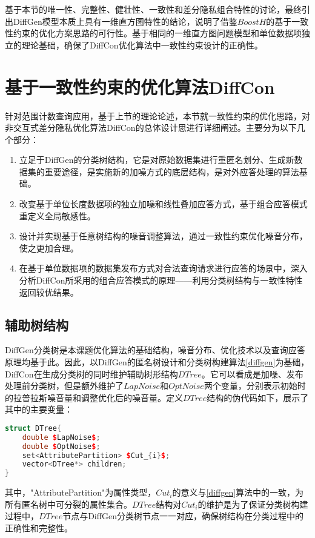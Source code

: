 基于本节的唯一性、完整性、健壮性、一致性和差分隐私组合特性的讨论，最终引出DiffGen模型本质上具有一维直方图特性的结论，说明了借鉴$BoostH$的基于一致性约束的优化方案思路的可行性。基于相同的一维直方图问题模型和单位数据项独立的理论基础，确保了DiffCon优化算法中一致性约束设计的正确性。


\section{基于一致性约束的优化算法DiffCon}

针对范围计数查询应用，基于上节的理论论述，本节就一致性约束的优化思路，对非交互式差分隐私优化算法DiffCon的总体设计思进行详细阐述。主要分为以下几个部分：
\begin{enumerate}
	\item 立足于DiffGen的分类树结构，它是对原始数据集进行重匿名划分、生成新数据集的重要途径，是实施新的加噪方式的底层结构，是对外应答处理的算法基础。
	\item 改变基于单位长度数据项的独立加噪和线性叠加应答方式，基于组合应答模式重定义全局敏感性。
	\item 设计并实现基于任意树结构的噪音调整算法，通过一致性约束优化噪音分布，使之更加合理。
	\item 在基于单位数据项的数据集发布方式对合法查询请求进行应答的场景中，深入分析DiffCon所采用的组合应答模式的原理——利用分类树结构与一致性特性返回较优结果。
\end{enumerate}

\subsection{辅助树结构}

DiffGen分类树是本课题优化算法的基础结构，噪音分布、优化技术以及查询应答原理均基于此。因此，以DiffGen的匿名树设计和分类树构建算法\ref{diffgen}为基础，DiffCon在生成分类树的同时维护辅助树形结构$DTree$。它可以看成是加噪、发布处理前分类树，但是额外维护了$LapNoise$和$OptNoise$两个变量，分别表示初始时的拉普拉斯噪音量和调整优化后的噪音量。定义$DTree$结构的伪代码如下，展示了其中的主要变量：

\begin{lstlisting}[language={C++}, caption={DTree结构伪代码}]
struct DTree{
	double $LapNoise$;
	double $OptNoise$;
	set<AttributePartition> $Cut_{i}$;
	vector<DTree*> children;
}
\end{lstlisting}
其中，"AttributePartition"为属性类型，$Cut_{i}$的意义与\ref{diffgen}算法中的一致，为所有匿名树中可分裂的属性集合。$DTree$结构对$Cut_{i}$的维护是为了保证分类树构建过程中，$DTree$节点与DiffGen分类树节点一一对应，确保树结构在分类过程中的正确性和完整性。

